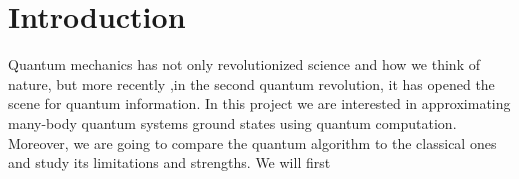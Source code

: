 \documentclass{physics_article}
\date{}
\begin{document}
	\maketitle
	\tableofcontents

	\section{Introduction \label{intro}}
	Quantum mechanics has not only revolutionized science and how we think of nature, but more recently ,in the second quantum revolution, it has opened the scene for quantum information. In this project we are interested in approximating many-body quantum systems ground states using quantum computation. Moreover, we are going to compare the quantum algorithm to the classical ones and study its limitations and strengths. We will first  
\end{document}
